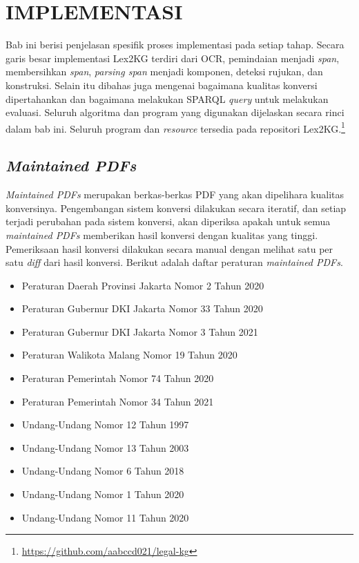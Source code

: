 \chapter{IMPLEMENTASI}
\label{chap:4}

Bab ini berisi penjelasan spesifik proses implementasi pada setiap tahap. Secara garis besar
implementasi Lex2KG terdiri dari OCR, pemindaian menjadi \textit{span}, membersihkan \textit{span},
\textit{parsing span} menjadi komponen, deteksi rujukan, dan konstruksi. Selain itu dibahas juga
mengenai bagaimana kualitas konversi dipertahankan dan bagaimana melakukan SPARQL \textit{query}
untuk melakukan evaluasi. Seluruh algoritma dan program yang digunakan dijelaskan secara rinci dalam
bab ini. Seluruh program dan \textit{resource} tersedia pada repositori
Lex2KG.\footnote{\url{https://github.com/aabccd021/legal-kg}}

\section{\textit{Maintained PDFs}}
\label{sec:maintained-pdfs}

\textit{Maintained PDFs} merupakan berkas-berkas PDF \legal yang akan dipelihara kualitas
konversinya. Pengembangan sistem konversi dilakukan secara iteratif, dan setiap terjadi perubahan
pada sistem konversi, akan diperiksa apakah untuk semua \textit{maintained PDFs} memberikan hasil
konversi dengan kualitas yang tinggi. Pemeriksaan hasil konversi dilakukan secara manual dengan
melihat satu per satu \textit{diff} dari hasil konversi. Berikut adalah daftar peraturan
\textit{maintained PDFs}.

\begin{itemize}
  \item Peraturan Daerah Provinsi Jakarta Nomor 2 Tahun 2020
  \item Peraturan Gubernur DKI Jakarta Nomor 33 Tahun 2020
  \item Peraturan Gubernur DKI Jakarta Nomor 3 Tahun 2021
  \item Peraturan Walikota Malang Nomor 19 Tahun 2020
  \item Peraturan Pemerintah Nomor 74 Tahun 2020
  \item Peraturan Pemerintah Nomor 34 Tahun 2021
  \item Undang-Undang Nomor 12 Tahun 1997
  \item Undang-Undang Nomor 13 Tahun 2003
  \item Undang-Undang Nomor 6 Tahun 2018
  \item Undang-Undang Nomor 1 Tahun 2020
  \item Undang-Undang Nomor 11 Tahun 2020
\end{itemize}

